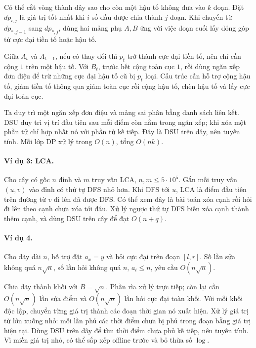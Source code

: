 \documentclass[11pt]{article}
\begin{document}
Có thể cắt vòng thành dây sao cho còn một hậu tố không đưa vào \(k\) đoạn. Đặt
\(dp_{i,j}\) là giá trị tốt nhất khi \(i\) số đầu được chia thành \(j\) đoạn.
Khi chuyển từ \(dp_{\ast,j-1}\) sang \(dp_{\ast,j}\), dùng hai mảng phụ \(A,B\)
ứng với việc đoạn cuối lấy đóng góp từ cực đại tiền tố hoặc hậu tố.

Giữa \(A_t\) và \(A_{t-1}\), nếu có thay đổi thì \(p_t\) trở thành cực đại tiền
tố, nên chỉ cần cộng \(1\) trên một hậu tố. Với \(B_t\), trước hết cộng toàn
cục \(1\), rồi dùng ngăn xếp đơn điệu để trừ những cực đại hậu tố cũ bị \(p_t\)
loại. Cấu trúc cần hỗ trợ cộng hậu tố, giảm tiền tố thông qua giảm toàn cục rồi
cộng hậu tố, chèn hậu tố và lấy cực đại toàn cục.

Ta duy trì một ngăn xếp đơn điệu và mảng sai phân bằng danh sách liên kết. DSU
duy trì vị trí đầu tiên sau mỗi điểm còn nằm trong ngăn xếp; khi xóa một phần
tử chỉ hợp nhất nó với phần tử kế tiếp. Đây là DSU trên dây, nên tuyến tính.
Mỗi lớp DP xử lý trong \(O(n)\), tổng \(O(nk)\).

\paragraph{Ví dụ 3: LCA.}
Cho cây có gốc \(n\) đỉnh và \(m\) truy vấn LCA, \(n,m\le 5\cdot 10^5\). Gắn
mỗi truy vấn \((u,v)\) vào đỉnh có thứ tự DFS nhỏ hơn. Khi DFS tới \(u\), LCA
là điểm đầu tiên trên đường từ \(v\) đi lên đã được DFS. Có thể xem đây là bài
toán xóa cạnh rồi hỏi đi lên theo cạnh chưa xóa tới đâu. Xử lý ngược thứ tự DFS
biến xóa cạnh thành thêm cạnh, và dùng DSU trên cây để đạt \(O(n+q)\).

\paragraph{Ví dụ 4.}
Cho dãy dài \(n\), hỗ trợ đặt \(a_x=y\) và hỏi cực đại trên đoạn \([l,r]\). Số
lần sửa không quá \(n\sqrt n\), số lần hỏi không quá \(n\), \(a_i\le n\), yêu
cầu \(O(n\sqrt n)\).

Chia dãy thành khối với \(B=\sqrt n\). Phần rìa xử lý trực tiếp; còn lại cần
\(O(n\sqrt n)\) lần sửa điểm và \(O(n\sqrt n)\) lần hỏi cực đại toàn khối. Với
mỗi khối độc lập, chuyển từng giá trị thành các đoạn thời gian nó xuất hiện.
Xử lý giá trị từ lớn xuống nhỏ: mỗi lần phủ các thời điểm chưa bị phủ trong
đoạn bằng giá trị hiện tại. Dùng DSU trên dây để tìm thời điểm chưa phủ kế
tiếp, nên tuyến tính. Vì miền giá trị nhỏ, có thể sắp xếp offline trước và bỏ
thừa số \(\log\).
\end{document}

